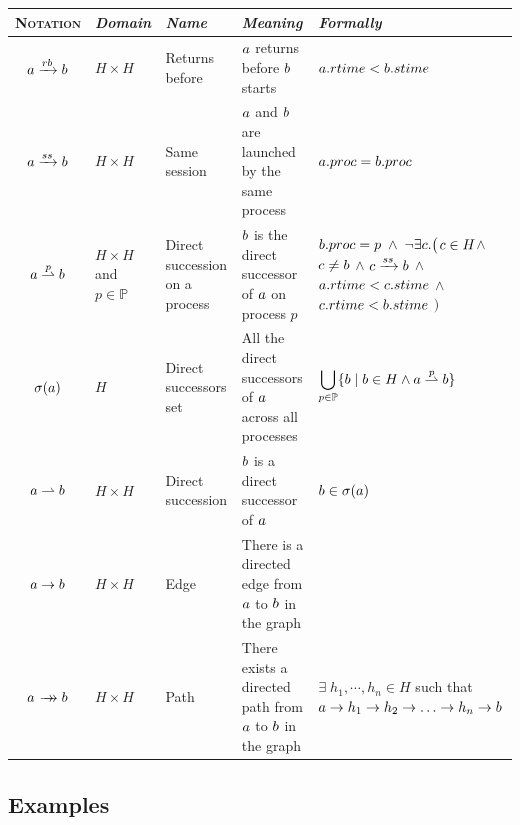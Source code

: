 \documentclass[12pt]{article}
\begin{document}
{\centering \small
\begin{tabular}{||c | >{\centering\arraybackslash}p{2cm}
	| >{\centering\arraybackslash}p{3cm}
	|>{\centering\arraybackslash}p{4cm} 
	|>{\centering\arraybackslash}p{5cm} ||} 
 \hline
\textsc{Notation} & \textsl{Domain} & \textsl{Name} & \textsl{Meaning} & \textsl{Formally} \\ [0.5ex] 
 \hline\hline
$a\xrightarrow{rb}b$ & $H\times H$ & Returns before & $a$ returns before $b$ starts & $a.rtime<b.stime$ \\
 \hline
$a\xrightarrow{ss}b$ & $H\times H$ & Same session & $a$ and $b$ are launched by the same process & $a.proc=b.proc$ \\
 \hline
$a\stackrel{p}{\rightharpoonup}b$ & $H\times H$ and $p\in\mathbb{P}$ & Direct succession on a process & $b$ is the direct successor of $a$ on process $p$ & $b.proc=p \;\land\; 
\neg\exists c.\big( $\mbox{$c\in H$}$\land $ \mbox{$c\neq b$} $\land$ \mbox{$c\xrightarrow{ss}b$} $\land$ \mbox{$a.rtime<c.stime$} $\land$ \mbox{$c.rtime<b.stime$} $\big)$ \\
 \hline
 $\sigma(a)$ & $H$ & Direct successors set & All the direct successors of $a$ across all processes & $\displaystyle\bigcup_{p \in \mathbb{P}} \{b \mid 
b \in H  \land a\stackrel{p}{\rightharpoonup}b  \}$ \\
\hline
$a\rightharpoonup b$ & $H\times H$ & Direct succession & $b$ is a direct successor of $a$ & $b\in\sigma(a)$ \\
\hline
$a\rightarrow b$ & $H\times H$ & Edge & There is a directed edge from $a$ to $b$ in the graph & \\
\hline
$\opa\patharrow\opb$ & $H\times H$ & Path & There exists a directed path from $a$ to $b$ in the graph & $\exists\; h_1,\cdots,h_n\in H$ such that $a\rightarrow h_1\rightarrow h_2\rightarrow \hdots\rightarrow h_n\rightarrow b$ \\
\hline
\end{tabular}
}

\subsection{Examples}


\clearpage


\onecolumn





\end{document}
